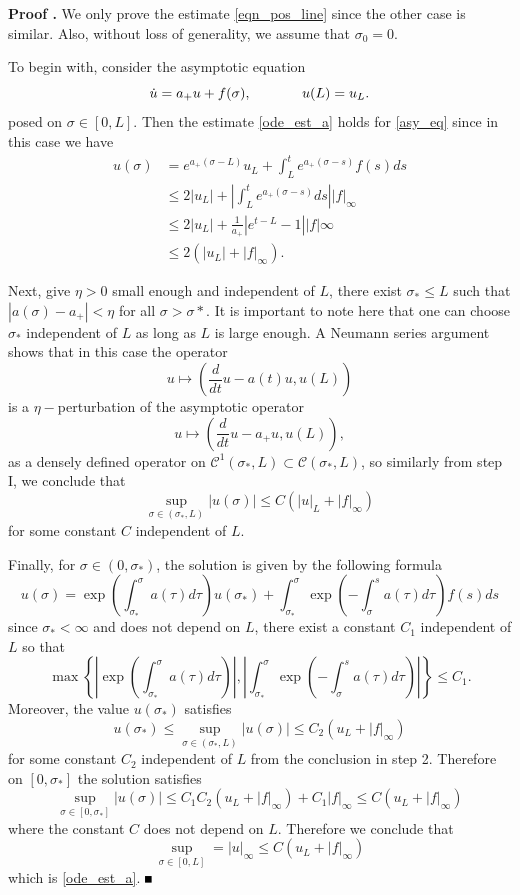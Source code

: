 \documentclass[letterpaper,11pt]{article}
\numberwithin{equation}{section}
\theoremstyle{plain}
\newenvironment{Proof}[1][\unskip]%
 {\begin{trivlist} \item[]{\bf Proof #1. }}%
 {\hspace*{\fill}$\rule{.4\baselineskip}{.4\baselineskip}$\end{trivlist}}
\begin{document}
\begin{Proof}
We only prove the estimate \eqref{eqn_pos_line} since the other case is similar. Also, without loss of generality, we assume that $\sigma_0 = 0$.

To begin with, consider the asymptotic equation 
\begin{equation}\label{asy_eq}
\dot{u} = a_+ u + f(\sigma),\hspace{ 0.5in } u(L) = u_L.
\end{equation}
posed on $\sigma \in [0, L]$.
Then the estimate \eqref{ode_est_a} holds for \eqref{asy_eq} since in this case we have
\begin{align*}
u(\sigma) &= e^{a_+(\sigma-L)}u_L + \int_L^t e^{a_+(\sigma-s)} f(s)ds \\ 
&\le 2|u_L| + \left|\int_L^t e^{a_+(\sigma-s)}ds \right| |f|_\infty\\ 
&\le  2|u_L|+\frac{1}{a_+} \left|e^{t-L}-1\right||f|\infty\\
& \le 2(|u_L|+|f|_\infty ).
\end{align*}

Next, give $\eta>0$ small enough and independent of $L$, there exist $\sigma_* \le L$ such that $|a(\sigma)- a_+|< \eta$ for all $\sigma>\sigma*$. It is important to note here that one can choose $\sigma_*$ independent of $L$ as long as $L$ is large enough. A Neumann series argument shows that in this case the operator 
\[ u \mapsto
 \left(\frac{d}{dt}u-a(t)u, u(L)\right)
\] is a $\eta-$perturbation of the asymptotic operator
\[ u \mapsto
 \left(\frac{d}{dt}u-a_+u, u(L)\right),
\]
as a densely defined operator on $\mathcal{C}^1(\sigma_*,L) \subset \mathcal{C}(\sigma_*,L)$, so similarly from step I, we conclude that 
\[
\sup_{\sigma \in (\sigma_*,L)} |u(\sigma)| \le C(|u|_L + |f|_\infty)
\]
for some constant $C$ independent of $L$.

Finally, for $\sigma \in (0,\sigma_*)$, the solution is given by the following formula
\[
u(\sigma) = \exp\left(\int^{\sigma}_{\sigma_*} a(\tau)d\tau\right) u(\sigma_*) + \int_{\sigma_*}^{\sigma} \exp\left(-\int_{\sigma}^{s}a(\tau)d\tau\right)f(s)ds 
\]
since $\sigma_*< \infty$ and does not depend on $L$, there exist a constant $C_1$ independent of $L$ so that 
\[
\max\left\{ \left|\exp\left(\int^{\sigma}_{\sigma_*} a(\tau)d\tau\right)\right|, \left| \int_{\sigma_*}^{\sigma} \exp\left(-\int_{\sigma}^{s}a(\tau)d\tau\right)\right| \right\} \le C_1.
\]
Moreover, the value $u(\sigma_*)$ satisfies
\[
u(\sigma_*) \le \sup_{\sigma \in (\sigma_*,L)} |u(\sigma)| \le C_2(u_L + |f|_\infty)
\]
for some constant $C_2$ independent of $L$ from the conclusion in step 2.
Therefore on $[0,\sigma_*]$ the solution satisfies
\[
\sup_{\sigma \in [0,\sigma_*]}|u(\sigma)| \le C_1C_2(u_L+|f|_\infty) +C_1|f|_\infty \le C(u_L+|f|_\infty)
\]
where the constant $C$ does not depend on $L$. Therefore we conclude that
\[
\sup_{\sigma \in [0,L]} = |u|_\infty \le C(u_L+|f|_\infty)
\]
which is \eqref{ode_est_a}.
\nocite{*}
\end{Proof}





\end{document}
